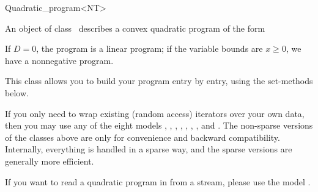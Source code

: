 \begin{ccRefClass}{Quadratic_program<NT>}


\ccDefinition
An object of class \ccRefName\ describes a convex quadratic program of the form


If $D=0$, the program is
a linear program; if the variable bounds are $x\geq 0$, we have a 
nonnegative program.

This class allows you to build your program entry by entry, using
the set-methods below. 

If you only need to wrap existing (random access) 
iterators over your own data, then you may use any of the eight models
, 
, 
, 
, 
,
,
, and
.
The non-sparse versions of the classes above are only for convenience and backward compatibility.
Internally, everything is handled in a sparse way, and the sparse versions
are generally more efficient.

If you want to read a quadratic program in  from a stream, 
please use the model .

\ccIsModel
{}\\
\\
\\

\ccTypes


\ccCreation
\ccIndexClassCreation
{}


\end{ccRefClass}
